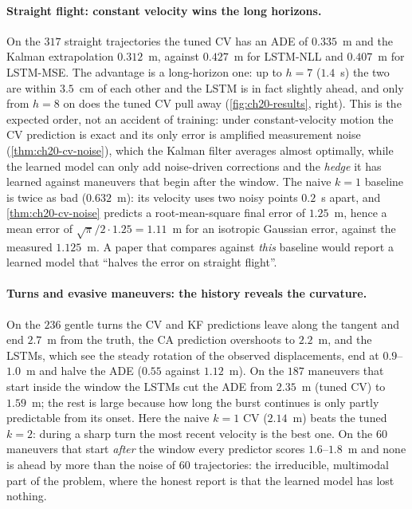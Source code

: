 \paragraph{Straight flight: constant velocity wins the long horizons.}
On the $317$ straight trajectories the tuned CV has an ADE of $0.335$~m and
the Kalman extrapolation $0.312$~m, against $0.427$~m for LSTM-NLL and
$0.407$~m for LSTM-MSE. The advantage is a long-horizon one: up to $h = 7$
($1.4$~s) the two are within $3.5$~cm of each other and the LSTM is in fact
slightly ahead, and only from $h = 8$ on does the tuned CV pull away
(\cref{fig:ch20-results}, right). This is the expected order, not an accident
of training: under constant-velocity motion the CV prediction is exact and
its only error is amplified measurement noise (\cref{thm:ch20-cv-noise}),
which the Kalman filter averages almost optimally, while the learned model
can only add noise-driven corrections and the \emph{hedge} it has learned
against maneuvers that begin after the window. The naive $k = 1$ baseline is
twice as bad ($0.632$~m): its velocity uses two noisy points $0.2$~s apart,
and \cref{thm:ch20-cv-noise} predicts a root-mean-square final error of
$1.25$~m, hence a mean error of $\sqrt{\pi}/2 \cdot 1.25 = 1.11$~m for an
isotropic Gaussian error, against the measured $1.125$~m. A paper that
compares against \emph{this} baseline would report a learned model that
``halves the error on straight flight''.

\paragraph{Turns and evasive maneuvers: the history reveals the curvature.}
On the $236$ gentle turns the CV and KF predictions leave along the tangent
and end $2.7$~m from the truth, the CA prediction overshoots to $2.2$~m, and
the LSTMs, which see the steady rotation of the observed displacements, end
at $0.9$--$1.0$~m and halve the ADE ($0.55$ against $1.12$~m). On the $187$
maneuvers that start inside the window the LSTMs cut the ADE from $2.35$~m
(tuned CV) to $1.59$~m; the rest is large because how long the burst
continues is only partly predictable from its onset. Here the naive $k = 1$
CV ($2.14$~m) beats the tuned $k = 2$: during a sharp turn the most recent
velocity is the best one. On the $60$ maneuvers that start \emph{after} the
window every predictor scores $1.6$--$1.8$~m and none is ahead by more than
the noise of $60$ trajectories: the irreducible, multimodal part of the
problem, where the honest report is that the learned model has lost
nothing.

